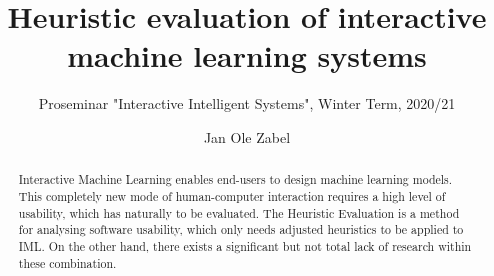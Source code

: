 \documentclass[sigchi]{acmart}
\makeatletter
\newcommand{\myLongTitle}{Heuristic evaluation of interactive machine learning systems} %
\newcommand{\myShortTitle}{HE of IML systems} %
\makeatother
\begin{document}
\title{\myLongTitle{}}

\subtitle{Proseminar "Interactive Intelligent Systems", Winter Term, 2020/21}

\author{Jan Ole Zabel}

\renewcommand{\shortauthors}{J. Zabel - \myShortTitle{}}


\begin{abstract}
Interactive Machine Learning enables end-users to design machine learning models. This completely new mode of human-computer interaction requires a high level of usability, which has naturally to be evaluated. The Heuristic Evaluation is a method for analysing software usability, which only needs adjusted heuristics to be applied to IML. On the other hand, there exists a significant but not total lack of research within these combination.
\end{abstract}


\maketitle


\let\oldaddcontentsline\addcontentsline
\newcommand{\stoptocentries}{\renewcommand{\addcontentsline}[3]{}}
\newcommand{\starttocentries}{\let\addcontentsline\oldaddcontentsline}
\end{document}
